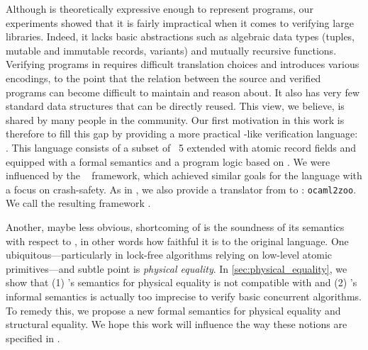Although \HeapLang is theoretically expressive enough to represent \OCaml programs, our experiments showed that it is fairly impractical when it comes to verifying large \OCaml libraries.
Indeed, it lacks basic abstractions such as algebraic data types (tuples, mutable and immutable records, variants) and mutually recursive functions.
Verifying \OCaml programs in \HeapLang requires difficult translation choices and introduces various encodings, to the point that the relation between the source and verified programs can become difficult to maintain and reason about.
It also has very few standard data structures that can be directly reused.
This view, we believe, is shared by many people in the \Iris community.
Our first motivation in this work is therefore to fill this gap by providing a more practical \OCaml-like verification language: \ZooLang.
This language consists of a subset of \OCaml~5 extended with atomic record fields and equipped with a formal semantics and a program logic based on \Iris.
We were influenced by the \Perennial~\cite{DBLP:conf/sosp/ChajedTKZ19,DBLP:conf/osdi/ChajedTT0KZ21,DBLP:conf/osdi/ChajedTTKZ22,DBLP:conf/osdi/Chang0STKZ23} framework, which achieved similar goals for the \Go language with a focus on crash-safety.
As in \Perennial, we also provide a translator from \OCaml to \ZooLang: \texttt{ocaml2zoo}.
We call the resulting framework \Zoo.

Another, maybe less obvious, shortcoming of \HeapLang is the soundness of its semantics with respect to \OCaml, in other words how faithful it is to the original language.
One ubiquitous---particularly in lock-free algorithms relying on low-level atomic primitives---and subtle point is \emph{physical equality}.
In \cref{sec:physical_equality}, we show that (1) \HeapLang's semantics for physical equality is not compatible with \OCaml and (2) \OCaml's informal semantics is actually too imprecise to verify basic concurrent algorithms.
To remedy this, we propose a new formal semantics for physical equality and structural equality.
We hope this work will influence the way these notions are specified in \OCaml.

